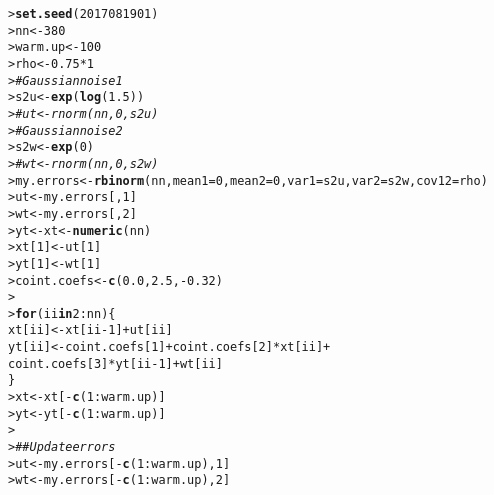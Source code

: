 \documentclass[a4paper, 11pt]{article}\usepackage[]{graphicx}\usepackage[]{color}
\makeatletter
\newcommand{\hlnum}[1]{\textcolor[rgb]{0.686,0.059,0.569}{#1}}%
\newcommand{\hlcom}[1]{\textcolor[rgb]{0.678,0.584,0.686}{\textit{#1}}}%
\newcommand{\hlopt}[1]{\textcolor[rgb]{0,0,0}{#1}}%
\newcommand{\hlstd}[1]{\textcolor[rgb]{0.345,0.345,0.345}{#1}}%
\newcommand{\hlkwa}[1]{\textcolor[rgb]{0.161,0.373,0.58}{\textbf{#1}}}%
\newcommand{\hlkwb}[1]{\textcolor[rgb]{0.69,0.353,0.396}{#1}}%
\newcommand{\hlkwc}[1]{\textcolor[rgb]{0.333,0.667,0.333}{#1}}%
\newcommand{\hlkwd}[1]{\textcolor[rgb]{0.737,0.353,0.396}{\textbf{#1}}}%
\newenvironment{kframe}{%
 \def\at@end@of@kframe{}%
 \ifinner\ifhmode%
  \def\at@end@of@kframe{\end{minipage}}%
  \begin{minipage}{\columnwidth}%
 \fi\fi%
 \def\FrameCommand##1{\hskip\@totalleftmargin \hskip-\fboxsep
 \colorbox{shadecolor}{##1}\hskip-\fboxsep
     \hskip-\linewidth \hskip-\@totalleftmargin \hskip\columnwidth}%
 \MakeFramed {\advance\hsize-\width
   \@totalleftmargin\z@ \linewidth\hsize
   \@setminipage}}%
 {\par\unskip\endMakeFramed%
 \at@end@of@kframe}
\newenvironment{knitrout}{}{} %
\makeatother
\begin{document}
\begin{knitrout}\scriptsize
{}\color{fgcolor}\begin{kframe}
\begin{alltt}
\hlstd{> }\hlkwd{set.seed}\hlstd{(}\hlnum{2017081901}\hlstd{)}
\hlstd{> }\hlstd{nn} \hlkwb{<-} \hlnum{380}
\hlstd{> }\hlstd{warm.up} \hlkwb{<-} \hlnum{100}
\hlstd{> }\hlstd{rho} \hlkwb{<-} \hlnum{0.75} \hlopt{*} \hlnum{1}
\hlstd{> }\hlcom{# Gaussian noise1}
\hlstd{> }\hlstd{s2u} \hlkwb{<-} \hlkwd{exp}\hlstd{(}\hlkwd{log}\hlstd{(}\hlnum{1.5}\hlstd{))}
\hlstd{> }\hlcom{#ut <- rnorm(nn, 0, s2u)}
\hlstd{> }\hlcom{# Gaussian noise2}
\hlstd{> }\hlstd{s2w} \hlkwb{<-} \hlkwd{exp}\hlstd{(}\hlnum{0}\hlstd{)}
\hlstd{> }\hlcom{#wt <- rnorm(nn, 0, s2w)}
\hlstd{> }\hlstd{my.errors} \hlkwb{<-} \hlkwd{rbinorm}\hlstd{(nn,} \hlkwc{mean1} \hlstd{=} \hlnum{0}\hlstd{,} \hlkwc{mean2} \hlstd{=} \hlnum{0}\hlstd{,} \hlkwc{var1} \hlstd{= s2u,} \hlkwc{var2} \hlstd{= s2w,} \hlkwc{cov12} \hlstd{= rho)}
\hlstd{> }\hlstd{ut} \hlkwb{<-} \hlstd{my.errors[,} \hlnum{1}\hlstd{]}
\hlstd{> }\hlstd{wt} \hlkwb{<-} \hlstd{my.errors[,} \hlnum{2}\hlstd{]}
\hlstd{> }\hlstd{yt} \hlkwb{<-} \hlstd{xt} \hlkwb{<-} \hlkwd{numeric}\hlstd{(nn)}
\hlstd{> }\hlstd{xt[}\hlnum{1}\hlstd{]} \hlkwb{<-} \hlstd{ut[}\hlnum{1}\hlstd{]}
\hlstd{> }\hlstd{yt[}\hlnum{1}\hlstd{]} \hlkwb{<-} \hlstd{wt[}\hlnum{1}\hlstd{]}
\hlstd{> }\hlstd{coint.coefs} \hlkwb{<-} \hlkwd{c}\hlstd{(}\hlnum{0.0}\hlstd{,} \hlnum{2.5}\hlstd{,} \hlopt{-}\hlnum{0.32}\hlstd{)}
\hlstd{> }
\hlstd{> }\hlkwa{for} \hlstd{(ii} \hlkwa{in} \hlnum{2}\hlopt{:}\hlstd{nn) \{}
\hlstd{  }  \hlstd{xt[ii]} \hlkwb{<-}  \hlstd{xt[ii} \hlopt{-} \hlnum{1}\hlstd{]} \hlopt{+} \hlstd{ut[ii]}
\hlstd{  }  \hlstd{yt[ii]} \hlkwb{<-} \hlstd{coint.coefs[}\hlnum{1}\hlstd{]} \hlopt{+} \hlstd{coint.coefs[}\hlnum{2}\hlstd{]} \hlopt{*} \hlstd{xt[ii]}  \hlopt{+}
\hlstd{  }                     \hlstd{coint.coefs[}\hlnum{3}\hlstd{]} \hlopt{*} \hlstd{yt[ii} \hlopt{-} \hlnum{1}\hlstd{]} \hlopt{+} \hlstd{wt[ii]}
\hlstd{  }\hlstd{\}}
\hlstd{> }\hlstd{xt} \hlkwb{<-} \hlstd{xt[}\hlopt{-}\hlkwd{c}\hlstd{(}\hlnum{1}\hlopt{:}\hlstd{warm.up)]}
\hlstd{> }\hlstd{yt} \hlkwb{<-} \hlstd{yt[}\hlopt{-}\hlkwd{c}\hlstd{(}\hlnum{1}\hlopt{:}\hlstd{warm.up)]}
\hlstd{> }
\hlstd{> }\hlcom{## Update errors}
\hlstd{> }\hlstd{ut} \hlkwb{<-} \hlstd{my.errors[}\hlopt{-}\hlkwd{c}\hlstd{(}\hlnum{1}\hlopt{:}\hlstd{warm.up),} \hlnum{1}\hlstd{]}
\hlstd{> }\hlstd{wt} \hlkwb{<-} \hlstd{my.errors[}\hlopt{-}\hlkwd{c}\hlstd{(}\hlnum{1}\hlopt{:}\hlstd{warm.up),} \hlnum{2}\hlstd{]}
\end{alltt}
\end{kframe}
\end{knitrout}
\end{document}
